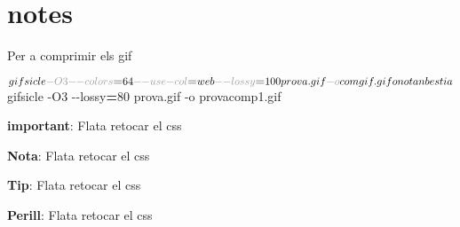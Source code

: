 \documentclass[
  10pt, krantz2,
]{krantz}
\newenvironment{Shaded}{\begin{snugshade}}{\end{snugshade}}
\newcommand{\AttributeTok}[1]{\textcolor[rgb]{0.61,0.61,0.61}{#1}}
\newcommand{\ExtensionTok}[1]{#1}
\newcommand{\NormalTok}[1]{#1}
\newcommand{\OperatorTok}[1]{\textcolor[rgb]{0.43,0.43,0.43}{\textbf{#1}}}
\begin{document}
\hypertarget{notes}{%
\chapter{notes}\label{notes}}

Per a comprimir els gif

\begin{Shaded}
\begin{Highlighting}[]
\ExtensionTok{$}\NormalTok{ gifsicle }\AttributeTok{{-}O3} \AttributeTok{{-}{-}colors}\OperatorTok{=}\NormalTok{64 }\AttributeTok{{-}{-}use{-}col}\OperatorTok{=}\NormalTok{web }\AttributeTok{{-}{-}lossy}\OperatorTok{=}\NormalTok{100 prova.gif }\AttributeTok{{-}o}\NormalTok{ comgif.gif}

\ExtensionTok{o}\NormalTok{ no tan bestia}

\ExtensionTok{$}\NormalTok{ gifsicle }\AttributeTok{{-}O3} \AttributeTok{{-}{-}lossy}\OperatorTok{=}\NormalTok{80 prova.gif }\AttributeTok{{-}o}\NormalTok{ provacomp1.gif}
\end{Highlighting}
\end{Shaded}

\textbf{important}: Flata retocar el css

\textbf{Nota}: Flata retocar el css

\textbf{Tip}: Flata retocar el css

\textbf{Perill}: Flata retocar el css

  
\end{document}
